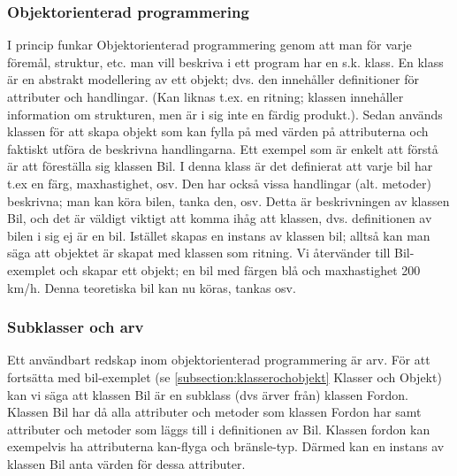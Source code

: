 \documentclass[12pt,a4paper]{article}
\begin{document}
\subsubsection{Objektorienterad programmering}
I princip funkar Objektorienterad programmering genom att man för varje föremål, struktur, etc. man vill beskriva i ett program har en s.k. klass. En klass är en abstrakt modellering av ett objekt; dvs. den innehåller definitioner för attributer och handlingar. (Kan liknas t.ex. en ritning; klassen innehåller information om strukturen, men är i sig inte en färdig produkt.). Sedan används klassen för att skapa objekt som kan fylla på med värden på attributerna och faktiskt utföra de beskrivna handlingarna. Ett exempel som är enkelt att förstå är att föreställa sig klassen Bil. I denna klass är det definierat att varje bil har t.ex en färg, maxhastighet, osv. Den har också vissa handlingar (alt. metoder) beskrivna; man kan köra bilen, tanka den, osv. Detta är beskrivningen av klassen Bil, och det är väldigt viktigt att komma ihåg att klassen, dvs. definitionen av bilen i sig ej är en bil. Istället skapas en instans av klassen bil; alltså kan man säga att objektet är skapat med klassen som ritning. Vi återvänder till Bil-exemplet och skapar ett objekt; en bil med färgen blå och maxhastighet 200 km/h. Denna teoretiska bil kan nu köras, tankas osv.
\subsubsection{Subklasser och arv}
Ett användbart redskap inom objektorienterad programmering är arv. För att fortsätta med bil-exemplet (se \ref{subsection:klasserochobjekt} Klasser och Objekt) kan vi säga att klassen Bil är en subklass (dvs ärver från) klassen Fordon. Klassen Bil har då alla attributer och metoder som klassen Fordon har samt attributer och metoder som läggs till i definitionen av Bil. Klassen fordon kan exempelvis ha attributerna kan-flyga och bränsle-typ. Därmed kan en instans av klassen Bil anta värden för dessa attributer.
\end{document}
